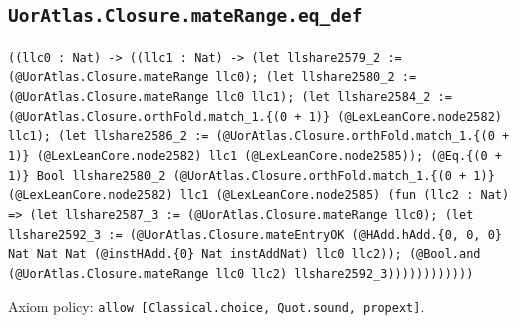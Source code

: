 \documentclass[11pt]{article}
\begin{document}
\subsection*{\texttt{UorAtlas.Closure.mateRange.eq\_def}}
\noindent\texttt{((llc0 : Nat) -> ((llc1 : Nat) -> (let llshare2579\_2 := (@UorAtlas.Closure.mateRange llc0); (let llshare2580\_2 := (@UorAtlas.Closure.mateRange llc0 llc1); (let llshare2584\_2 := (@UorAtlas.Closure.orthFold.match\_1.\{(0 + 1)\} (@LexLeanCore.node2582) llc1); (let llshare2586\_2 := (@UorAtlas.Closure.orthFold.match\_1.\{(0 + 1)\} (@LexLeanCore.node2582) llc1 (@LexLeanCore.node2585)); (@Eq.\{(0 + 1)\} Bool llshare2580\_2 (@UorAtlas.Closure.orthFold.match\_1.\{(0 + 1)\} (@LexLeanCore.node2582) llc1 (@LexLeanCore.node2585) (fun (llc2 : Nat) => (let llshare2587\_3 := (@UorAtlas.Closure.mateRange llc0); (let llshare2592\_3 := (@UorAtlas.Closure.mateEntryOK (@HAdd.hAdd.\{0, 0, 0\} Nat Nat Nat (@instHAdd.\{0\} Nat instAddNat) llc0 llc2)); (@Bool.and (@UorAtlas.Closure.mateRange llc0 llc2) llshare2592\_3))))))))))))}\par
\noindent Axiom policy: \texttt{allow [Classical.choice, Quot.sound, propext]}.\par
\end{document}
